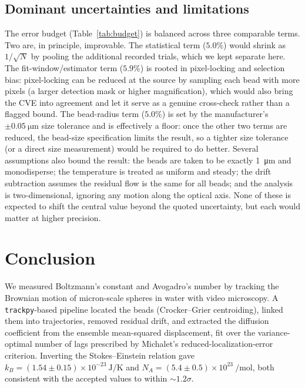\documentclass[11pt]{article}
\begin{document}
\subsection{Dominant uncertainties and limitations}
\label{ssec:limits}
The error budget (Table~\ref{tab:budget}) is balanced across three comparable terms.
Two are, in principle, improvable. The statistical term ($5.0\%$) would shrink as
$1/\sqrt{N}$ by pooling the additional recorded trials, which we kept separate here.
The fit-window/estimator term ($5.9\%$) is rooted in pixel-locking and selection
bias: pixel-locking can be reduced at the source by sampling each bead with more
pixels (a larger detection mask or higher magnification), which would also bring the
CVE into agreement and let it serve as a genuine cross-check rather than a flagged
bound. The bead-radius term ($5.0\%$) is set by the manufacturer's
$\pm\SI{0.05}{\micro\meter}$ size tolerance and is effectively a floor: once the
other two terms are reduced, the bead-size specification limits the result, so a
tighter size tolerance (or a direct size measurement) would be required to do better.
Several assumptions also bound the result: the beads are taken to be exactly
\SI{1}{\micro\meter} and monodisperse; the temperature is treated as uniform and
steady; the drift subtraction assumes the residual flow is the same for all beads;
and the analysis is two-dimensional, ignoring any motion along the optical axis.
None of these is expected to shift the central value beyond the quoted uncertainty,
but each would matter at higher precision.

\FloatBarrier
\section{Conclusion}
\label{Conclusion}
We measured Boltzmann's constant and Avogadro's number by tracking the Brownian
motion of micron-scale spheres in water with video microscopy. A
\texttt{trackpy}-based pipeline located the beads (Crocker--Grier centroiding),
linked them into trajectories, removed residual drift, and extracted the diffusion
coefficient from the ensemble mean-squared displacement, fit over the
variance-optimal number of lags prescribed by Michalet's reduced-localization-error
criterion. Inverting the Stokes--Einstein relation gave
$k_B = (1.54\pm0.15)\times10^{-23}~\si{\joule\per\kelvin}$ and
$N_A = (5.4\pm0.5)\times10^{23}~\si{\per\mole}$, both consistent with the accepted
values to within $\sim$$1.2\sigma$.
\end{document}
